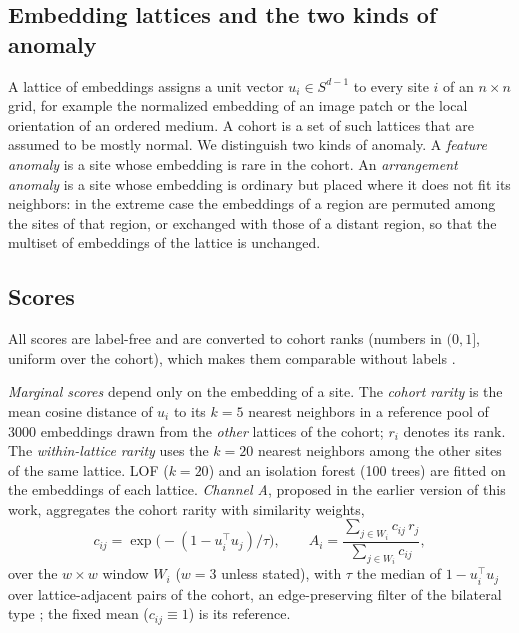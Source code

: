 \documentclass[preprint,review,12pt]{elsarticle}
\begin{document}
\subsection{Embedding lattices and the two kinds of anomaly}
A lattice of embeddings assigns a unit vector $u_i\in S^{d-1}$ to every site $i$ of an $n\times n$ grid, for example the normalized embedding of an image patch or the local orientation of an ordered medium. A cohort is a set of such lattices that are assumed to be mostly normal. We distinguish two kinds of anomaly. A \emph{feature anomaly} is a site whose embedding is rare in the cohort. An \emph{arrangement anomaly} is a site whose embedding is ordinary but placed where it does not fit its neighbors: in the extreme case the embeddings of a region are permuted among the sites of that region, or exchanged with those of a distant region, so that the multiset of embeddings of the lattice is unchanged.

\subsection{Scores}
All scores are label-free and are converted to cohort ranks (numbers in $(0,1]$, uniform over the cohort), which makes them comparable without labels \citep{Kriegel2011}.

\emph{Marginal scores} depend only on the embedding of a site. The \emph{cohort rarity} is the mean cosine distance of $u_i$ to its $k=5$ nearest neighbors in a reference pool of 3000 embeddings drawn from the \emph{other} lattices of the cohort; $r_i$ denotes its rank. The \emph{within-lattice rarity} uses the $k=20$ nearest neighbors among the other sites of the same lattice. LOF ($k=20$) \citep{Breunig2000} and an isolation forest (100 trees) \citep{Liu2008} are fitted on the embeddings of each lattice. \emph{Channel A}, proposed in the earlier version of this work, aggregates the cohort rarity with similarity weights,
\begin{equation}
c_{ij}=\exp\!\bigl(-(1-u_i^{\top}u_j)/\tau\bigr),\qquad A_i=\frac{\sum_{j\in W_i}c_{ij}\,r_j}{\sum_{j\in W_i}c_{ij}},
\label{eq:simw}
\end{equation}
over the $w\times w$ window $W_i$ ($w=3$ unless stated), with $\tau$ the median of $1-u_i^{\top}u_j$ over lattice-adjacent pairs of the cohort, an edge-preserving filter of the bilateral type \citep{Tomasi1998}; the fixed mean ($c_{ij}\equiv1$) is its reference.
\end{document}
